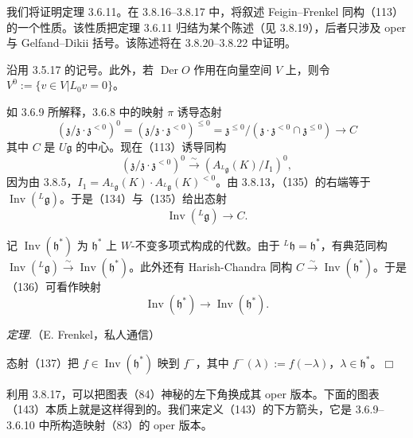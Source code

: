  我们将证明定理 3.6.11。在 3.8.16--3.8.17 中，将叙述 Feigin--Frenkel 同构（113）的一个性质。该性质把定理 3.6.11 归结为某个陈述（见 3.8.19），后者只涉及 oper 与 Gelfand--Dikii 括号。该陈述将在 3.8.20--3.8.22 中证明。

 沿用 3.5.17 的记号。此外，若 $\operatorname{Der}O$ 作用在向量空间 $V$ 上，则令 $V^{0}:=\{v\in V|L_{0}v=0\}$。

如 3.6.9 所解释，3.6.8 中的映射 $\pi$ 诱导态射
\begin{equation}\tag{134}
  (\mathfrak{z}/\mathfrak{z}\cdot\mathfrak{z}^{<0})^{0}=(\mathfrak{z}/\mathfrak{z}\cdot\mathfrak{z}^{<0})^{\le 0}
  =\mathfrak{z}^{\le 0}/(\mathfrak{z}\cdot\mathfrak{z}^{<0}\cap\mathfrak{z}^{\le 0})\to C
\end{equation}
其中 $C$ 是 $U\mathfrak{g}$ 的中心。现在（113）诱导同构
\begin{equation}\tag{135}
  (\mathfrak{z}/\mathfrak{z}\cdot\mathfrak{z}^{<0})^{0}\xrightarrow{\sim}(A_{{}^{L}\mathfrak{g}}(K)/I_{1})^{0},
\end{equation}
因为由 3.8.5，$I_{1}=A_{{}^{L}\mathfrak{g}}(K)\cdot A_{{}^{L}\mathfrak{g}}(K)^{<0}$。由 3.8.13，（135）的右端等于 $\operatorname{Inv}({}^{L}\mathfrak{g})$。于是（134）与（135）给出态射
\begin{equation}\tag{136}
  \operatorname{Inv}({}^{L}\mathfrak{g})\to C.
\end{equation}

记 $\operatorname{Inv}(\mathfrak{h}^{*})$ 为 $\mathfrak{h}^{*}$ 上 $W$-不变多项式构成的代数。由于 ${}^{L}\mathfrak{h}=\mathfrak{h}^{*}$，有典范同构 $\operatorname{Inv}({}^{L}\mathfrak{g})\xrightarrow{\sim}\operatorname{Inv}(\mathfrak{h}^{*})$。此外还有 Harish-Chandra 同构 $C\xrightarrow{\sim}\operatorname{Inv}(\mathfrak{h}^{*})$。于是（136）可看作映射
\begin{equation}\tag{137}
  \operatorname{Inv}(\mathfrak{h}^{*})\to\operatorname{Inv}(\mathfrak{h}^{*}).
\end{equation}

 \emph{定理.}（E. Frenkel，私人通信）

态射（137）把 $f\in\operatorname{Inv}(\mathfrak{h}^{*})$ 映到 $f^{-}$，其中 $f^{-}(\lambda):=f(-\lambda)$，$\lambda\in\mathfrak{h}^{*}$。\hfill$\Box$

 利用 3.8.17，可以把图表（84）神秘的左下角换成其 oper 版本。下面的图表（143）本质上就是这样得到的。我们来定义（143）的下方箭头，它是 3.6.9--3.6.10 中所构造映射（83）的 oper 版本。

